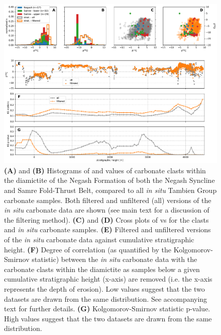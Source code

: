 \begin{figure}[h!]
\begin{center}
	\includegraphics[width=\textwidth]{figures/Tambien/clast-analysis-pval.pdf}
	\caption{\textbf{(A)} and \textbf{(B)} Histograms of \dC and \dO values of carbonate clasts within the diamictite of the Negash Formation of both the Negash Syncline and Samre Fold-Thrust Belt, compared to all \textit{in situ} Tambien Group carbonate samples. Both filtered and unfiltered (all) versions of the \textit{in situ} carbonate data are shown (see main text for a discussion of the filtering method). \textbf{(C)} and \textbf{(D)} Cross plots of \dC vs \dO for the clasts and \textit{in situ} carbonate samples. \textbf{(E)} Filtered and unfiltered versions of the \textit{in situ} carbonate \dC data against cumulative stratigraphic height. \textbf{(F)} Degree of correlation (as quantified by the Kolgomorov-Smirnov statistic) between the \textit{in situ} carbonate \dC data with the carbonate clasts within the diamictite as samples below a given cumulative stratigraphic height (x-axis) are removed (i.e. the x-axis represents the depth of erosion). Low values suggest that the two datasets are drawn from the same distribution. See accompanying text for further details. \textbf{(G)} Kolgomorov-Smirnov statistic p-value. High values suggest that the two datasets are drawn from the same distribution.}
	\label{fig:clast-analysis-pval}
\end{center}
\end{figure}

